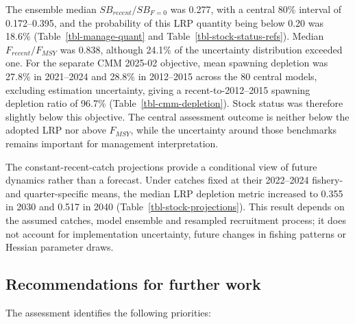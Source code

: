 \documentclass[
  english,
  a4paper,
  a4paper,
  11pt]{SCreport}
\begin{document}
The ensemble median \(SB_{recent}/SB_{F=0}\) was 0.277, with a central
80\% interval of 0.172--0.395, and the probability of this LRP quantity
being below 0.20 was 18.6\% (Table~\ref{tbl-manage-quant} and
Table~\ref{tbl-stock-status-refs}). Median \(F_{recent}/F_{MSY}\) was
0.838, although 24.1\% of the uncertainty distribution exceeded one. For
the separate CMM 2025-02 objective, mean spawning depletion was 27.8\%
in 2021--2024 and 28.8\% in 2012--2015 across the 80 central models,
excluding estimation uncertainty, giving a recent-to-2012--2015 spawning
depletion ratio of 96.7\% (Table~\ref{tbl-cmm-depletion}). Stock status
was therefore slightly below this objective. The central assessment
outcome is neither below the adopted LRP nor above \(F_{MSY}\), while
the uncertainty around those benchmarks remains important for management
interpretation.

The constant-recent-catch projections provide a conditional view of
future dynamics rather than a forecast. Under catches fixed at their
2022--2024 fishery- and quarter-specific means, the median LRP depletion
metric increased to 0.355 in 2030 and 0.517 in 2040
(Table~\ref{tbl-stock-projections}). This result depends on the assumed
catches, model ensemble and resampled recruitment process; it does not
account for implementation uncertainty, future changes in fishing
patterns or Hessian parameter draws.

\subsection{Recommendations for further
work}\label{recommendations-for-further-work}

The assessment identifies the following priorities:
\end{document}

